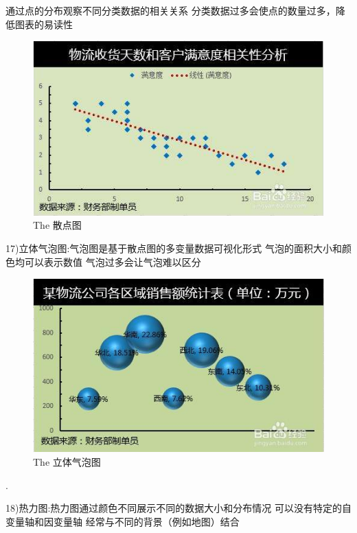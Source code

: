 \documentclass{article}
\begin{document}
\begin{itemize}
    		通过点的分布观察不同分类数据的相关关系
    		分类数据过多会使点的数量过多，降低图表的易读性\par
    		\begin{figure}[h!]
    			\centering
    			\includegraphics[scale=0.7]{san}
    			\caption{The 散点图}
    			\label{fig:sandian}
    		\end{figure}
    		17)立体气泡图:气泡图是基于散点图的多变量数据可视化形式
    		气泡的面积大小和颜色均可以表示数值
    		气泡过多会让气泡难以区分\par
    		\begin{figure}[h!]
    			\centering
    			\includegraphics[scale=0.7]{li}
    			\caption{The 立体气泡图}
    			\label{fig:li}
    		\end{figure}
    	.\par	
    		18)热力图:热力图通过颜色不同展示不同的数据大小和分布情况
    		可以没有特定的自变量轴和因变量轴
    		经常与不同的背景（例如地图）结合\par
    		\begin{figure}[h!]
    			\centering

\end{figure}
\end{itemize}
\end{document}
